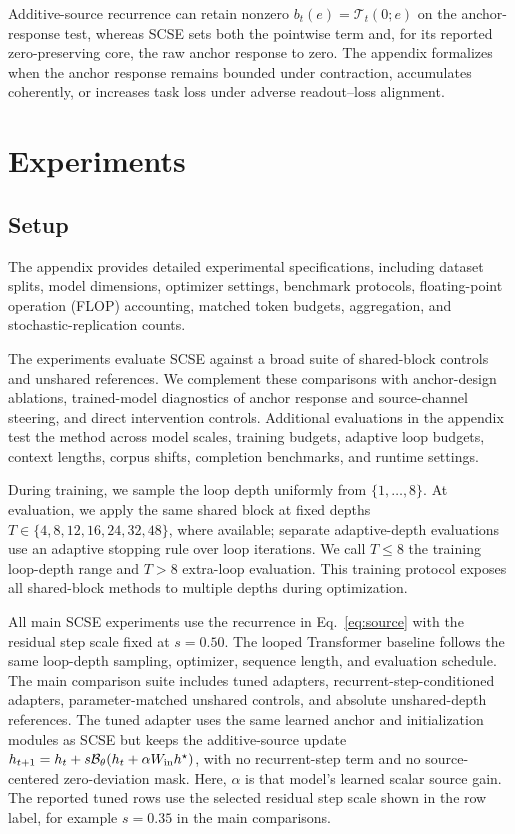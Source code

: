 \documentclass[letterpaper]{article} %
\newcommand{\SCSE}{\textsc{SCSE}}
\newcommand{\Block}{\mathcal{B}}
\newcommand{\Tmap}{\mathcal{T}}
\theoremstyle{remark}
\begin{document}
Additive-source recurrence can retain nonzero $b_t(e)=\Tmap_t(0;e)$ on the anchor-response test, whereas \SCSE{} sets both the pointwise term and, for its reported zero-preserving core, the raw anchor response to zero.  The appendix formalizes when the anchor response remains bounded under contraction, accumulates coherently, or increases task loss under adverse readout--loss alignment.

\section{Experiments}
\subsection{Setup}
The appendix provides detailed experimental specifications, including dataset splits, model dimensions, optimizer settings, benchmark protocols, floating-point operation (FLOP) accounting, matched token budgets, aggregation, and stochastic-replication counts.

The experiments evaluate \SCSE{} against a broad suite of shared-block controls and unshared references.  We complement these comparisons with anchor-design ablations, trained-model diagnostics of anchor response and source-channel steering, and direct intervention controls.  Additional evaluations in the appendix test the method across model scales, training budgets, adaptive loop budgets, context lengths, corpus shifts, completion benchmarks, and runtime settings.

During training, we sample the loop depth uniformly from $\{1,\ldots,8\}$.  At evaluation, we apply the same shared block at fixed depths $T\in\{4,8,12,16,24,32,48\}$, where available; separate adaptive-depth evaluations use an adaptive stopping rule over loop iterations.  We call $T\leq8$ the training loop-depth range and $T>8$ extra-loop evaluation.  This training protocol exposes all shared-block methods to multiple depths during optimization.

All main \SCSE{} experiments use the recurrence in Eq.~\ref{eq:source} with the residual step scale fixed at $s=0.50$.  The looped Transformer baseline follows the same loop-depth sampling, optimizer, sequence length, and evaluation schedule.  The main comparison suite includes tuned adapters, recurrent-step-conditioned adapters, parameter-matched unshared controls, and absolute unshared-depth references.  The tuned adapter uses the same learned anchor and initialization modules as \SCSE{} but keeps the additive-source update $h_{t+1}=h_t+s\Block_\theta(h_t+\alpha W_{\rm in}h^\star)$, with no recurrent-step term and no source-centered zero-deviation mask.  Here, $\alpha$ is that model's learned scalar source gain.  The reported tuned rows use the selected residual step scale shown in the row label, for example $s=0.35$ in the main comparisons.
\end{document}
